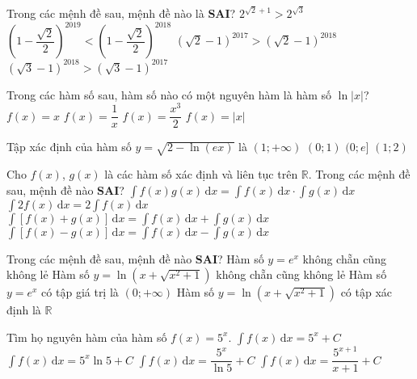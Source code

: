 \begin{ex}%
Trong các mệnh đề sau, mệnh đề nào là \textbf{SAI}?
\choice
{$2^{\sqrt{2}+1}>2^{\sqrt{3}}$}
{$\left(1-\dfrac{\sqrt{2}}{2}\right)^{2019}<\left(1-\dfrac{\sqrt{2}}{2}\right)^{2018}$}
{$\left(\sqrt{2}-1\right)^{2017}>\left(\sqrt{2}-1\right)^{2018}$}
{\True $\left(\sqrt{3}-1\right)^{2018}>\left(\sqrt{3}-1\right)^{2017}$}
\end{ex}

\begin{ex}%
Trong các hàm số sau, hàm số nào có một nguyên hàm là hàm số $\ln|x|$?
\choice
{$f(x)=x$}
{\True $f(x)=\dfrac{1}{x}$}
{$f(x)=\dfrac{x^3}{2}$}
{$f(x)=|x|$}
\end{ex}

\begin{ex}%
Tập xác định của hàm số $y=\sqrt{2-\ln(ex)}$ là
\choice
{$(1;+\infty)$}
{$(0;1)$}
{\True $(0;e]$}
{$(1;2)$}
\end{ex}

\begin{ex}%
Cho $f(x)$, $g(x)$ là các hàm số xác định và liên tục trên $\mathbb{R}$. Trong các mệnh đề sau, mệnh đề nào \textbf{SAI}?
\choice
{\True $\displaystyle\int f(x)g(x)\mathrm{\, d}x = \displaystyle\int f(x)\mathrm{\, d}x \cdot \displaystyle\int g(x)\mathrm{\, d}x$}
{$\displaystyle\int 2f(x)\mathrm{\, d}x = 2\displaystyle\int f(x)\mathrm{\, d}x$}
{$\displaystyle\int \left[f(x)+g(x)\right]\mathrm{\, d}x = \displaystyle\int f(x)\mathrm{\, d}x + \displaystyle\int g(x)\mathrm{\, d}x$}
{$\displaystyle\int \left[f(x)-g(x)\right]\mathrm{\, d}x = \displaystyle\int f(x)\mathrm{\, d}x - \displaystyle\int g(x)\mathrm{\, d}x$}
\end{ex}

\begin{ex}%
Trong các mệnh đề sau, mệnh đề nào \textbf{SAI}?
\choice
{Hàm số $y=e^x$ không chẵn cũng không lẻ}
{\True Hàm số $y=\ln\left(x+\sqrt{x^2+1}\right)$ không chẵn cũng không lẻ}
{Hàm số $y=e^x$ có tập giá trị là $(0;+\infty)$}
{Hàm số $y=\ln\left(x+\sqrt{x^2+1}\right)$ có tập xác định là $\mathbb{R}$}
\end{ex}

\begin{ex}%
Tìm họ nguyên hàm của hàm số $f(x)=5^x$.
\choice
{$\displaystyle\int f(x)\mathrm{\, d}x=5^x+C$}
{$\displaystyle\int f(x)\mathrm{\, d}x=5^x \ln 5+C$}
{\True $\displaystyle\int f(x)\mathrm{\, d}x= \dfrac{5^x}{\ln 5}+C$}
{$\displaystyle\int f(x)\mathrm{\, d}x=\dfrac{5^{x+1}}{x+1}+C$}
\end{ex}

